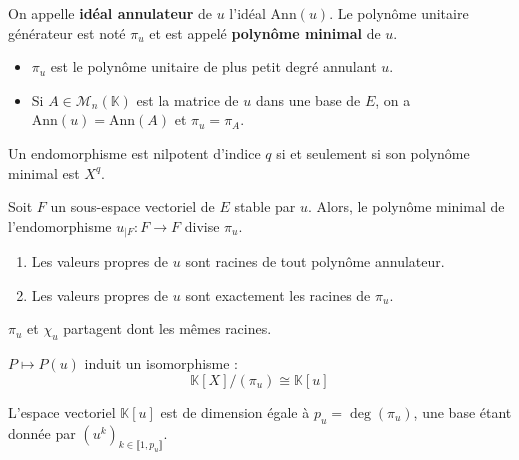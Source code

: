 	\begin{definition}
		On appelle \textbf{idéal annulateur} de $u$ l'idéal $\mathrm{Ann}(u)$. Le polynôme unitaire générateur est noté $\pi_u$ et est appelé \textbf{polynôme minimal} de $u$.
	\end{definition}
	
	\begin{remark}
		\begin{itemize}
			\item $\pi_u$ est le polynôme unitaire de plus petit degré annulant $u$.
			\item Si $A \in \mathcal{M}_n(\mathbb{K})$ est la matrice de $u$ dans une base de $E$, on a $\mathrm{Ann}(u) = \mathrm{Ann}(A)$ et $\pi_u = \pi_A$.
		\end{itemize}
	\end{remark}
	
	\begin{example}
		Un endomorphisme est nilpotent d'indice $q$ si et seulement si son polynôme minimal est $X^q$.
	\end{example}
	
	\begin{proposition}
		Soit $F$ un sous-espace vectoriel de $E$ stable par $u$. Alors, le polynôme minimal de l'endomorphisme $u_{|F} : F \rightarrow F$ divise $\pi_u$.
	\end{proposition}
	
	\begin{proposition}
		\begin{enumerate}[label=(\roman*)]
			\item Les valeurs propres de $u$ sont racines de tout polynôme annulateur.
			\item Les valeurs propres de $u$ sont exactement les racines de $\pi_u$.
		\end{enumerate}
	\end{proposition}
	
	
	\begin{remark}
		$\pi_u$ et $\chi_u$ partagent dont les mêmes racines.
	\end{remark}
	
	
	\begin{theorem}
		$P \mapsto P(u)$ induit un isomorphisme :
		\[ \mathbb{K}[X]/(\pi_u) \cong \mathbb{K}[u] \]
	\end{theorem}
	
	\begin{corollary}
		L'espace vectoriel $\mathbb{K}[u]$ est de dimension égale à $p_u = \deg(\pi_u)$, une base étant donnée par $(u^k)_{k \in \llbracket 1, p_u \rrbracket}$.
	\end{corollary}
	
